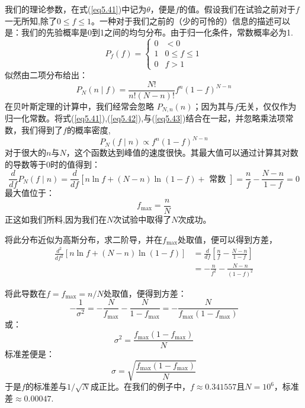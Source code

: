 \documentclass[UTF8]{ctexart}
\numberwithin{equation}{section}%
\numberwithin{figure}{section}%
\begin{document}
    我们的理论参数，在式(\ref{eq5.41})中记为$\theta$，便是$f$的值。假设我们在试验之前对于$f$一无所知,除了$0 \leq f \leq 1$。一种对于我们之前的（少的可怜的）信息的描述可以是：我们的先验概率是0到1之间的均匀分布。由于归一化条件，常数概率必为1.
    \begin{equation}\label{eq5.42}
    P_{f}(f)=\left\{\begin{array}{cc}
    0 & <0 \\
    1 & 0 \leq f \leq 1 \\
    0 & f>1
    \end{array}\right.
    \end{equation}
    似然由二项分布给出：
    \begin{equation}\label{eq5.43}
    P_{N}(n \mid f)=\frac{N !}{n !(N-n) !} f^{n}(1-f)^{N-n}
    \end{equation}
    在贝叶斯定理的计算中，我们经常会忽略 $P_{N, n}(n)$；因为其与$f$无关，仅仅作为归一化常数。将式(\ref{eq5.41}),(\ref{eq5.42}),与(\ref{eq5.43})结合在一起，并忽略乘法项常数，我们得到了$f$的概率密度,
    \begin{equation}
    P_{N}(f \mid n) \propto f^{n}(1-f)^{N-n}
    \end{equation}
    对于很大的$n$与$N$，这个函数达到峰值的速度很快。其最大值可以通过计算其对数的导数等于0时的值得到：
    \begin{equation}
    \frac{d}{d f} P_{N}(f \mid n)=\frac{d}{d f}[n \ln f+(N-n) \ln (1-f)+\text { 常数 }]=\frac{n}{f}-\frac{N-n}{1-f}=0
    \end{equation}
    最大值位于：
    \begin{equation}
    f_{\max }=\frac{n}{N} 
    \end{equation}
    正这如我们所料,因为我们在$N$次试验中取得了$N$次成功。
    
    将此分布近似为高斯分布，求二阶导，并在$f_{\max }$处取值，便可以得到方差，
    \begin{align}
    \frac{d^{2}}{d f^{2}}[n \ln f+(N-n) \ln (1-f)] &=\frac{d}{d f}\left[\frac{n}{f}-\frac{N-n}{1-f}\right] \\
    &=-\frac{n}{f^{2}}-\frac{N-n}{(1-f)^{2}}
    \end{align}
    
    将此导数在$f=f_{\max }=n / N$处取值，便得到方差：
    \begin{equation}
    -\frac{1}{\sigma^{2}}=-\frac{N}{f_{\max }}-\frac{N}{1-f_{\max }}=-\frac{N}{f_{\max }\left(1-f_{\max }\right)}
    \end{equation}
    或：
    \begin{equation}
    \sigma^{2}=\frac{f_{\max }\left(1-f_{\max }\right)}{N}
    \end{equation}
    标准差便是：
    \begin{equation}
    \sigma=\sqrt{\frac{f_{\max }\left(1-f_{\max }\right)}{N}}
    \end{equation}
    于是$f$的标准差与$1 / \sqrt{N}$成正比。在我们的例子中，$f \approx 0.341557$且$N=10^{6}$，标准差$\approx 0.00047$.
\end{document}
